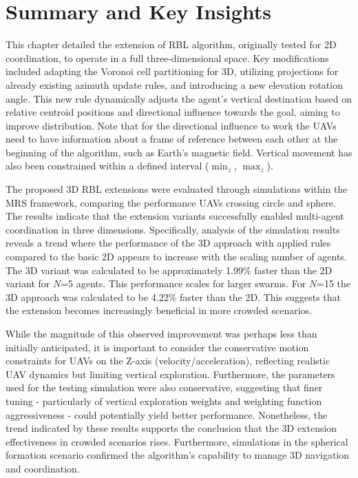     \section{Summary and Key Insights}
        This chapter detailed the extension of \ac{RBL} algorithm, originally tested for 2D coordination, to operate in a full three-dimensional space.
        Key modifications included adapting the Voronoi cell partitioning for 3D, utilizing projections for already existing azimuth update rules, and introducing a new elevation rotation angle.
        This new rule dynamically adjusts the agent's vertical destination based on relative centroid positions and directional influence towards the goal, aiming to improve distribution.
        Note that for the directional influence to work the \ac{UAV}s need to have information about a frame of reference between each other at the beginning of the algorithm, such as Earth's magnetic field.
        Vertical movement has also been constrained within a defined interval ($\min_z$, $\max_z$).

        The proposed 3D \ac{RBL} extensions were evaluated through simulations within the \ac{MRS} framework, comparing the performance \ac{UAV}s crossing circle and sphere. 
        The results indicate that the extension variants successfully enabled multi-agent coordination in three dimensions.
        Specifically, analysis of the simulation results reveals a trend where the performance of the 3D approach with applied rules compared to the basic 2D appears to increase with the scaling number of agents. 
        The 3D variant was calculated to be approximately 1.99\% faster than the 2D variant for $N$=5 agents.
        This performance scales for larger swarms.
        For $N$=15 the 3D approach was calculated to be 4.22\% faster than the 2D.
        This suggests that the extension becomes increasingly beneficial in more crowded scenarios.

        While the magnitude of this observed improvement was perhaps less than initially anticipated, it is important to consider the conservative motion constraints for \ac{UAV}s on the Z-axis (velocity/acceleration), reflecting realistic \ac{UAV} dynamics but limiting vertical exploration.
        Furthermore, the parameters used for the testing simulation were also conservative, suggesting that finer tuning - particularly of vertical exploration weights and weighting function aggressiveness - could potentially yield better performance.
        Nonetheless, the trend indicated by these results supports the conclusion that the 3D extension effectiveness in crowded scenarios rises.
        Furthermore, simulations in the spherical formation scenario confirmed the algorithm's capability to manage 3D navigation and coordination.

